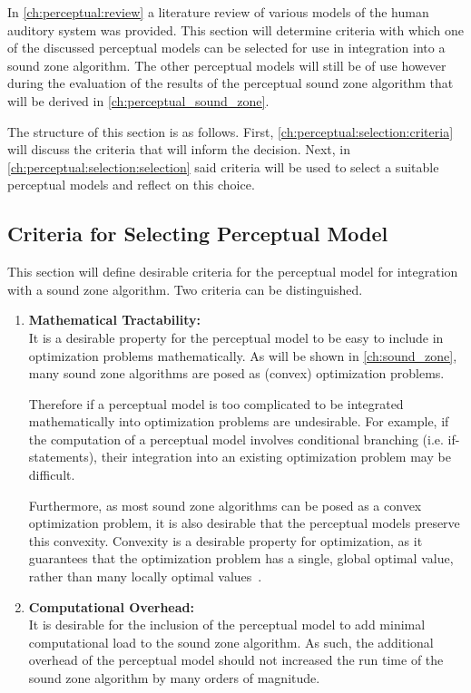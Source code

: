 In \autoref{ch:perceptual:review} a literature review of various models of the human auditory system was provided.
This section will determine criteria with which one of the discussed perceptual models can be selected for use
in integration into a sound zone algorithm.
The other perceptual models will still be of use however during the evaluation of the results of the perceptual
sound zone algorithm that will be derived in \autoref{ch:perceptual_sound_zone}.

The structure of this section is as follows.
First, \autoref{ch:perceptual:selection:criteria} will discuss the criteria that will inform the decision.
Next, in \autoref{ch:perceptual:selection:selection} said criteria will be used to select a suitable perceptual models 
and reflect on this choice.

\subsection{Criteria for Selecting Perceptual Model}
\label{ch:perceptual:selection:criteria}
This section will define desirable criteria for the perceptual model for integration with a sound zone algorithm.
Two criteria can be distinguished.
\begin{enumerate}
    \item \textbf{Mathematical Tractability:}\\
        It is a desirable property for the perceptual model to be easy to include in optimization problems mathematically.
        As will be shown in \autoref{ch:sound_zone}, many sound zone algorithms are posed as (convex) optimization 
        problems.

        Therefore if a perceptual model is too complicated to be integrated mathematically into optimization problems are
        undesirable.
        For example, if the computation of a perceptual model involves conditional branching (i.e. if-statements), their
        integration into an existing optimization problem may be difficult.

        Furthermore, as most sound zone algorithms can be posed as a convex optimization problem, it is also desirable that
        the perceptual models preserve this convexity.
        Convexity is a desirable property for optimization, as it guarantees that the optimization problem has a single, 
        global optimal value, rather than many locally optimal values~\cite{boyd2004convex}. 

    \item \textbf{Computational Overhead:}\\
        It is desirable for the inclusion of the perceptual model to add minimal computational load 
        to the sound zone algorithm.
        As such, the additional overhead of the perceptual model should not increased the run time of the sound zone 
        algorithm by many orders of magnitude.
\end{enumerate}

